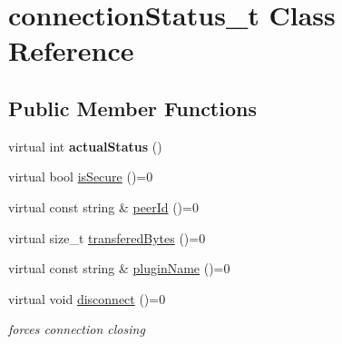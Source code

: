 \hypertarget{classconnectionStatus__t}{\section{connection\-Status\-\_\-t \-Class \-Reference}
\label{classconnectionStatus__t}
}
\subsection*{\-Public \-Member \-Functions}
\begin{DoxyCompactItemize}
\item 
\hypertarget{classconnectionStatus__t_aa68d45ed16c08841c2f643227df065e1}{virtual int {\bfseries actual\-Status} ()}\label{classconnectionStatus__t_aa68d45ed16c08841c2f643227df065e1}

\item 
virtual bool \hyperlink{classconnectionStatus__t_a15b9c2257b508a9f4553b69e3786fcdf}{is\-Secure} ()=0
\item 
virtual const string \& \hyperlink{classconnectionStatus__t_ab83eda54d9150e68fb8bbc69ed4f8627}{peer\-Id} ()=0
\item 
virtual size\-\_\-t \hyperlink{classconnectionStatus__t_a50a6552947511e845edcb3f18195bf72}{transfered\-Bytes} ()=0
\item 
virtual const string \& \hyperlink{classconnectionStatus__t_aa51c496f22d3edb8ae1a8544fb746cb2}{plugin\-Name} ()=0
\item 
\hypertarget{classconnectionStatus__t_aac0252d4ab5cd851fb4cb8dc747b8031}{virtual void \hyperlink{classconnectionStatus__t_aac0252d4ab5cd851fb4cb8dc747b8031}{disconnect} ()=0}\label{classconnectionStatus__t_aac0252d4ab5cd851fb4cb8dc747b8031}

\begin{DoxyCompactList}\small\item\em forces connection closing \end{DoxyCompactList}\end{DoxyCompactItemize}


